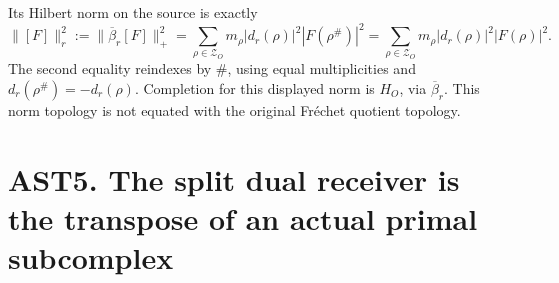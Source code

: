 Its Hilbert norm on the source is exactly \[
\|[F]\|_r^2:=\|\overline\beta_r[F]\|_+^2
=\sum_{\rho\in\mathscr Z_O}m_\rho|d_r(\rho)|^2|F(\rho^\#)|^2
=\sum_{\rho\in\mathscr Z_O}m_\rho|d_r(\rho)|^2|F(\rho)|^2.
\tag{AST4.4}
\] The second equality reindexes by \(\#\), using equal multiplicities
and \(d_r(\rho^\#)=-d_r(\rho)\). Completion for this displayed norm is
\(H_O\), via \(\overline\beta_r\). This norm topology is not equated
with the original Fréchet quotient topology.

\section{AST5. The split dual receiver is the transpose of an actual
primal
subcomplex}\label{ast5.-the-split-dual-receiver-is-the-transpose-of-an-actual-primal-subcomplex}

